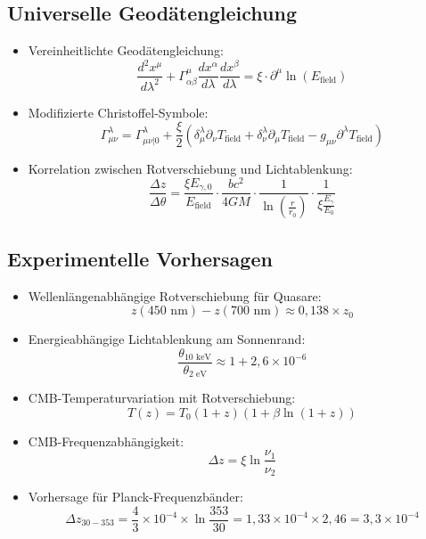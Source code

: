 \documentclass[12pt,a4paper]{article}
\begin{document}
	\subsection{Universelle Geod\"{a}tengleichung}
	\begin{itemize}
		\item Vereinheitlichte Geod\"{a}tengleichung:
		$$\boxed{\frac{d^2 x^\mu}{d\lambda^2} + \Gamma^\mu_{\alpha\beta}\frac{dx^\alpha}{d\lambda}\frac{dx^\beta}{d\lambda} = \xi \cdot \partial^\mu \ln(E_{\text{field}})}$$
		
		\item Modifizierte Christoffel-Symbole:
		$$\Gamma^\lambda_{\mu\nu} = \Gamma^\lambda_{\mu\nu|0} + \frac{\xi}{2} \left(\delta^\lambda_\mu \partial_\nu T_{\text{field}} + \delta^\lambda_\nu \partial_\mu T_{\text{field}} - g_{\mu\nu} \partial^\lambda T_{\text{field}}\right)$$
		
		\item Korrelation zwischen Rotverschiebung und Lichtablenkung:
		$$\frac{\Delta z}{\Delta \theta} = \frac{\xi E_{\gamma,0}}{E_{\text{field}}} \cdot \frac{bc^2}{4GM} \cdot \frac{1}{\ln\left(\frac{r}{r_0}\right)} \cdot \frac{1}{\xi \frac{E_\gamma}{E_0}}$$
	\end{itemize}
	
	\subsection{Experimentelle Vorhersagen}
\begin{itemize}
	\item Wellenl\"{a}ngenabh\"{a}ngige Rotverschiebung f\"{u}r Quasare:
	$$z(450\text{ nm}) - z(700\text{ nm}) \approx 0,138 \times z_0$$
	
	\item Energieabh\"{a}ngige Lichtablenkung am Sonnenrand:
	$$\frac{\theta_{10\text{ keV}}}{\theta_{2\text{ eV}}} \approx 1 + 2,6 \times 10^{-6}$$
	
	\item CMB-Temperaturvariation mit Rotverschiebung:
	$$T(z) = T_0(1+z)\left(1 + \beta \ln(1+z)\right)$$
	
	\item CMB-Frequenzabh\"{a}ngigkeit:
	$$\Delta z = \xi \ln\frac{\nu_1}{\nu_2}$$
	
	\item Vorhersage f\"{u}r Planck-Frequenzb\"{a}nder:
	$$\Delta z_{30-353} = \frac{4}{3} \times 10^{-4} \times \ln\frac{353}{30} = 1,33 \times 10^{-4} \times 2,46 = 3,3 \times 10^{-4}$$
\end{itemize}
\end{document}
